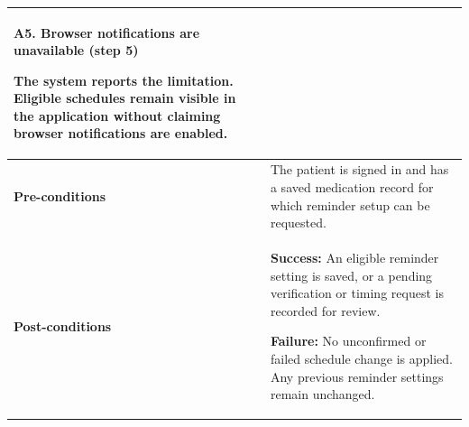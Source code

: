 \begin{longtable}{|p{}|p{}|}
\textbf{A5. Browser notifications are unavailable (step 5)}\par
The system reports the limitation. Eligible schedules remain visible in the application without claiming browser notifications are enabled.
\\ \hline
\textbf{Pre-conditions} &
The patient is signed in and has a saved medication record for which reminder setup can be requested. \\ \hline
\textbf{Post-conditions} &
\textbf{Success:} An eligible reminder setting is saved, or a pending verification or timing request is recorded for review.\par
\textbf{Failure:} No unconfirmed or failed schedule change is applied. Any previous reminder settings remain unchanged.
\\ \hline
\end{longtable}

